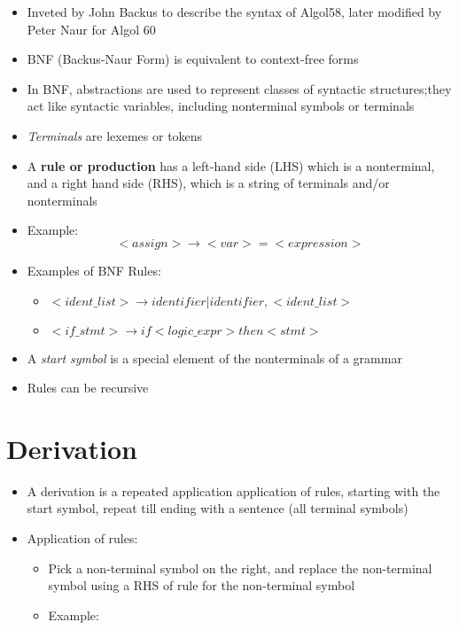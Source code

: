 \documentclass[12pt]{article}
\begin{document}
\begin{itemize}
  \item Inveted by John Backus to describe the syntax of Algol58, later modified by Peter Naur for Algol 60
  \item BNF (Backus-Naur Form) is equivalent to context-free forms
  \item In BNF, abstractions are used to represent classes of syntactic structures;they act like syntactic variables, including nonterminal symbols or terminals
  \item \textit{Terminals} are lexemes or tokens
  \item A \textbf{rule or production} has a left-hand side (LHS) which is a nonterminal, and a right hand side (RHS), which is a string of terminals and/or nonterminals
  \item Example:
  \begin{equation*}
    <assign> \to <var> = <expression>
  \end{equation*}
  \item Examples of BNF Rules:
  \begin{itemize}
    \item $<ident\_list> \to identifier | identifier, <ident\_list>$
    \item $<if\_stmt> \to if <logic\_expr> then <stmt>$
  \end{itemize}
  \item A \textit{start symbol} is a special element of the nonterminals of a grammar
  \item Rules can be recursive
\end{itemize}

\section{Derivation}

\begin{itemize}
  \item A derivation is a repeated application application of rules, starting with the start symbol, repeat till ending with a sentence (all terminal symbols)
  \item Application of rules:
  \begin{itemize}
    \item Pick a non-terminal symbol on the right, and replace the non-terminal symbol using a RHS of rule for the non-terminal symbol
    \item Example: \\
  \end{itemize}
\end{itemize}
\end{document}
